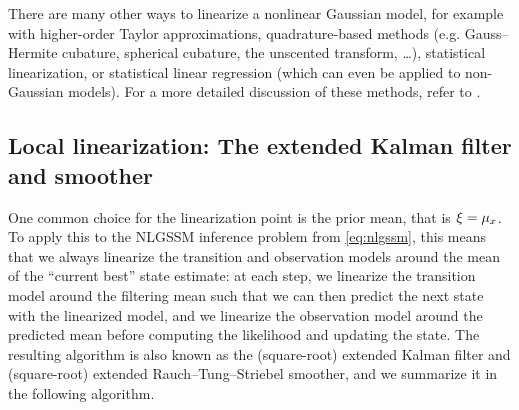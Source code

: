 \documentclass{mimosis}
\begin{document}
\begin{remark}
There are many other ways to linearize a nonlinear Gaussian model, for example with
higher-order Taylor approximations,
quadrature-based methods (e.g. Gauss--Hermite cubature, spherical cubature, the unscented transform, \ldots{}),
statistical linearization,
or statistical linear regression
(which can even be applied to non-Gaussian models).
For a more detailed discussion of these methods, refer to
\textcite[Chapter 7-10]{Särkkä_Svensson_2023}.
\end{remark}
\subsection{Local linearization: The extended Kalman filter and smoother}
\label{sec:org78085c2}
\label{sec:local-linearization}
\label{sec:nlgssm-inference:local}

One common choice for the linearization point is the prior mean, that is \(\xi = \mu_{x}\).
To apply this to the NLGSSM inference problem from \cref{eq:nlgssm},
this means that we always linearize the transition and observation models around the mean of the ``current best'' state estimate:
at each step, we linearize the transition model around the filtering mean
such that we can then predict the next state with the linearized model,
and we linearize the observation model around the predicted mean before computing the likelihood and updating the state.
The resulting algorithm is also known as the (square-root) extended Kalman filter and (square-root) extended Rauch--Tung--Striebel smoother, and we summarize it in the following algorithm.
\end{document}
